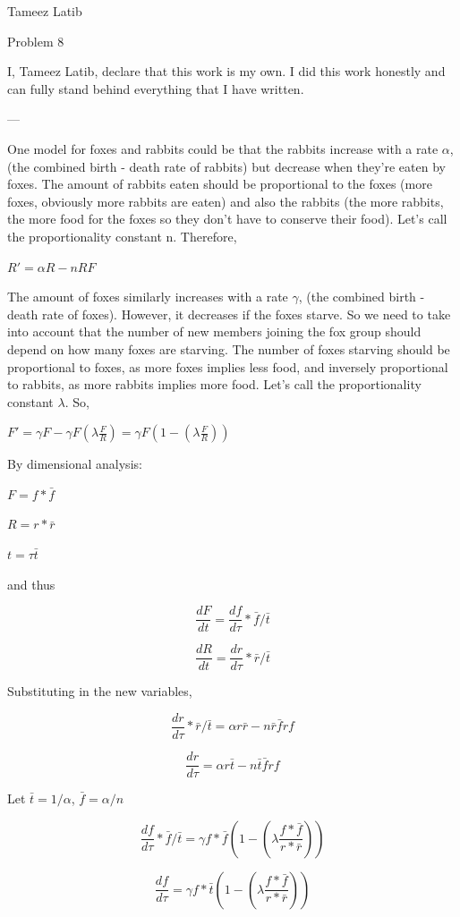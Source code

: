 \documentclass{article}
\begin{document}
Tameez Latib

Problem 8

I, Tameez Latib, declare that this work is my own. I did this work honestly and can fully stand behind everything that I have written.

---

One model for foxes and rabbits could be that the rabbits increase with a rate $\alpha$, (the combined birth - death rate of rabbits) but decrease when they're eaten by foxes. The amount of rabbits eaten should be proportional to the foxes (more foxes, obviously more rabbits are eaten) and also the rabbits (the more rabbits, the more food for the foxes so they don't have to conserve their food). Let's call the proportionality constant n. Therefore,

$R' = \alpha R - n RF$

The amount of foxes similarly increases with a rate $\gamma$, (the combined birth - death rate of foxes). However, it decreases if the foxes starve. So we need to take into account that the number of new members joining the fox group should depend on how many foxes are starving. The number of foxes starving should be proportional to foxes, as more foxes implies less food, and inversely proportional to rabbits, as more rabbits implies more food. Let's call the proportionality constant $\lambda$. So,

$F' = \gamma F - \gamma F (\lambda \frac{F}{R}) =  \gamma F(1 - (\lambda \frac{F}{R}))$

By dimensional analysis: 

$F = f*\bar{f}$

$R = r*\bar{r}$

$t = \tau \bar{t}$

and thus

$$\frac{dF}{dt} = \frac{df}{d\tau}*{\bar{f}}/{\bar{t}}$$

$$\frac{dR}{dt} = \frac{dr}{d\tau}*{\bar{r}}/{\bar{t}}$$

Substituting in the new variables,

$$ \frac{dr}{d\tau}*{\bar{r}}/{\bar{t}} = \alpha r\bar{r} - n \bar{r}\bar{f}rf$$

$$ \frac{dr}{d\tau} = \alpha r\bar{t} - n \bar{t}\bar{f}rf$$

Let $\bar{t} = 1/\alpha$, $\bar{f} = \alpha/n$

$$\frac{df}{d\tau}*{\bar{f}}/{\bar{t}}  = \gamma f*\bar{f}(1 - (\lambda \frac{f*\bar{f}}{r*\bar{r}}))$$

$$\frac{df}{d\tau}  = \gamma f*\bar{t}(1 - (\lambda \frac{f*\bar{f}}{r*\bar{r}}))$$
\end{document}
